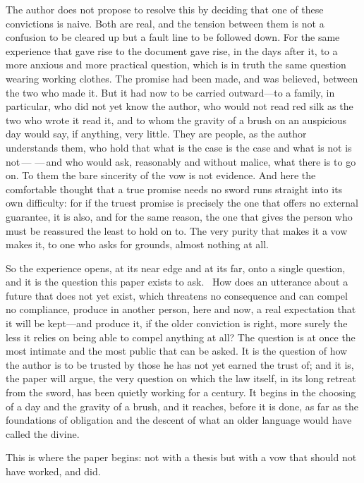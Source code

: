 The author does not propose to resolve this by deciding that one of these convictions is naive. Both are real, and the tension between them is not a confusion to be cleared up but a fault line to be followed down. For the same experience that gave rise to the document gave rise, in the days after it, to a more anxious and more practical question, which is in truth the same question wearing working clothes. The promise had been made, and was believed, between the two who made it. But it had now to be carried outward---to a family, in particular, who did not yet know the author, who would not read red silk as the two who wrote it read it, and to whom the gravity of a brush on an auspicious day would say, if anything, very little. They are people, as the author understands them, who hold that what is the case is the case and what is not is not\,---\,\,---\,and who would ask, reasonably and without malice, what there is to go on. To them the bare sincerity of the vow is not evidence. And here the comfortable thought that a true promise needs no sword runs straight into its own difficulty: for if the truest promise is precisely the one that offers no external guarantee, it is also, and for the same reason, the one that gives the person who must be reassured the least to hold on to. The very purity that makes it a vow makes it, to one who asks for grounds, almost nothing at all.

So the experience opens, at its near edge and at its far, onto a single question, and it is the question this paper exists to ask. \, How does an utterance about a future that does not yet exist, which threatens no consequence and can compel no compliance, produce in another person, here and now, a real expectation that it will be kept---and produce it, if the older conviction is right, more surely the less it relies on being able to compel anything at all? The question is at once the most intimate and the most public that can be asked. It is the question of how the author is to be trusted by those he has not yet earned the trust of; and it is, the paper will argue, the very question on which the law itself, in its long retreat from the sword, has been quietly working for a century. It begins in the choosing of a day and the gravity of a brush, and it reaches, before it is done, as far as the foundations of obligation and the descent of what an older language would have called the divine.

This is where the paper begins: not with a thesis but with a vow that should not have worked, and did.
